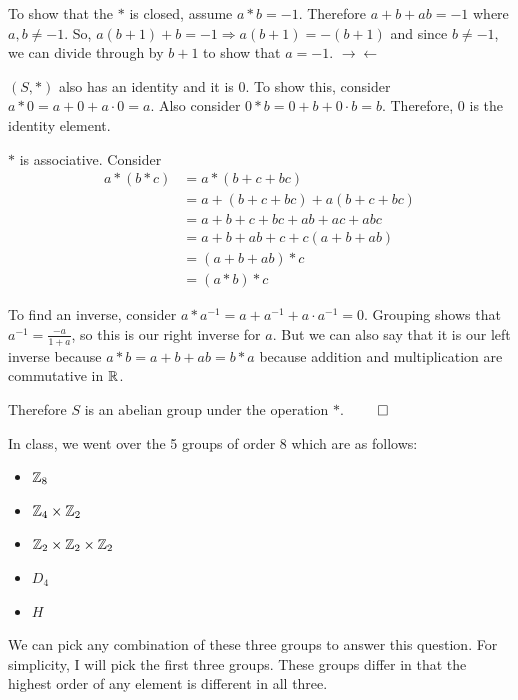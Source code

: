 \documentclass{report}
\begin{document}
\sol 

To show that the $*$ is closed, assume $a*b = -1$. Therefore $a + b + ab = -1$ where $a,b \neq -1$. So, $a(b+1) + b = -1 \Rightarrow a(b+1) = -(b+1)$ and since $b \neq -1$, we can divide through by $b+1$ to show that $a = -1$. $\rightarrow \leftarrow$

$(S, *)$ also has an identity and it is $0$. To show this, consider $a*0 = a + 0 + a\cdot 0 = a$. Also consider $0 * b = 0 + b + 0\cdot b = b$. Therefore, $0$ is the identity element.

$*$ is associative. Consider 
\begin{equation} 
    \begin{split}
    a * (b * c) & = a  * (b + c + bc) \\
    & = a + (b + c + bc) + a(b + c + bc) \\
    & = a + b + c + bc + ab + ac + abc \\
    & = a + b + ab + c + c(a + b + ab) \\
    & = (a + b + ab) * c \\
    & = (a * b) * c
    \end{split}
\end{equation}

To find an inverse, consider $a * a^{-1} = a + a^{-1} + a\cdot a^{-1} = 0$. Grouping shows that $a^{-1} = \displaystyle\frac{-a}{1 + a}$, so this is our right inverse for $a$. But we can also say that it is our left inverse because $a * b = a + b + ab = b*a$ because addition and multiplication are commutative in $\RR$.

Therefore $S$ is an abelian group under the operation $*$. $\qed$

\sol In class, we went over the 5 groups of order 8 which are as follows:

\begin{itemize}
    \item $\ZZ_8$
    \item $\ZZ_4 \times \ZZ_2$
    \item $\ZZ_2 \times \ZZ_2 \times \ZZ_2$
    \item $D_4$
    \item $H$
\end{itemize}

We can pick any combination of these three groups to answer this question. For simplicity, I will pick the first three groups. These groups differ in that the highest order of any element is different in all three. 
\end{document}
